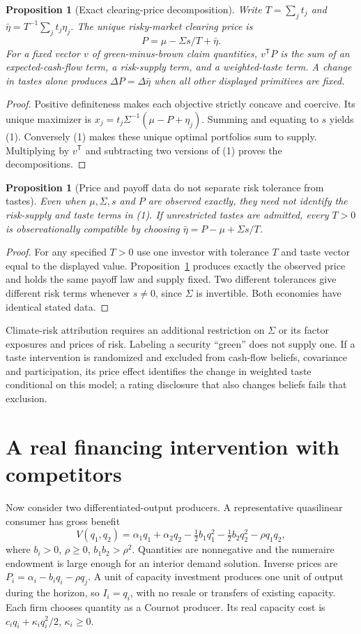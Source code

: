 \documentclass[11pt]{article}
\newtheorem{proposition}[theorem]{Proposition}
\begin{document}
\begin{proposition}[Exact clearing-price decomposition]\label{price}
Write $T=\sum_jt_j$ and $\bar\eta=T^{-1}\sum_jt_j\eta_j$. The unique
risky-market clearing price is
\[
 P=\mu-\Sigma s/T+\bar\eta.                         \tag{1}
\]
For a fixed vector $v$ of green-minus-brown claim quantities,
$v^\mathsf TP$ is the sum of an expected-cash-flow term, a risk-supply
term, and a weighted-taste term. A change in tastes alone produces
$\Delta P=\Delta\bar\eta$ when all other displayed primitives are fixed.
\end{proposition}
\begin{proof}
Positive definiteness makes each objective strictly concave and coercive.
Its unique maximizer is $x_j=t_j\Sigma^{-1}(\mu-P+\eta_j)$.
Summing and equating to $s$ yields (1). Conversely (1) makes these unique
optimal portfolios sum to supply. Multiplying by $v^\mathsf T$ and
subtracting two versions of (1) proves the decompositions.
\end{proof}

\begin{proposition}[Price and payoff data do not separate risk tolerance
from tastes]
Even when $\mu,\Sigma,s$ and $P$ are observed exactly, they need not
identify the risk-supply and taste terms in (1). If unrestricted tastes
are admitted, every $T>0$ is observationally compatible by choosing
$\bar\eta=P-\mu+\Sigma s/T$.
\end{proposition}
\begin{proof}
For any specified $T>0$ use one investor with tolerance $T$ and taste
vector equal to the displayed value. Proposition~\ref{price} produces
exactly the observed price and holds the same payoff law and supply fixed.
Two different tolerances give different risk terms whenever $s\ne0$,
since $\Sigma$ is invertible. Both economies have identical stated data.
\end{proof}

Climate-risk attribution requires an additional restriction on $\Sigma$
or its factor exposures and prices of risk. Labeling a security ``green''
does not supply one. If a taste intervention is randomized and excluded
from cash-flow beliefs, covariance and participation, its price effect
identifies the change in weighted taste conditional on this model; a
rating disclosure that also changes beliefs fails that exclusion.

\section{A real financing intervention with competitors}
Now consider two differentiated-output producers. A representative
quasilinear consumer has gross benefit
\[
 V(q_1,q_2)=\alpha_1q_1+\alpha_2q_2
 -\tfrac12 b_1q_1^2-\tfrac12 b_2q_2^2-\rho q_1q_2,
\]
where $b_i>0$, $\rho\geq0$, $b_1b_2>\rho^2$. Quantities are nonnegative
and the numeraire endowment is large enough for an interior demand
solution. Inverse prices are $P_i=\alpha_i-b_iq_i-\rho q_j$.
A unit of capacity investment produces one unit of output during the
horizon, so $I_i=q_i$, with no resale or transfers of existing capacity.
Each firm chooses quantity as a Cournot producer. Its real capacity cost
is $c_iq_i+\kappa_iq_i^2/2$, $\kappa_i\geq0$.
\end{document}
